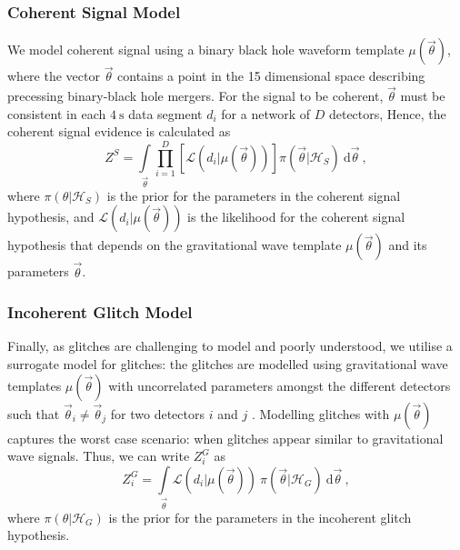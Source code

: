 \documentclass[%
preprint,
 amsmath,amssymb,
 aps,
]{revtex4}
\newcommand{\template}{{\sc $\mu(\vec{\theta})$}\xspace}
\newcommand{\parameters}{{\sc $\vec{\theta}$}\xspace}
\begin{document}
\subsubsection{Coherent Signal Model}
We model coherent signal using a binary black hole waveform template \template, where the vector \parameters contains a point in the 15 dimensional space describing precessing binary-black hole mergers. For the signal to be coherent, \parameters must be consistent in each $4\ \text{s}$ data segment $d_i$ for a network of $D$ detectors, Hence, the coherent signal evidence is calculated as
\begin{equation}
\label{eq:zs}
Z^S = \int\limits_{\vec{\theta}} \prod\limits^{D}_{i=1} \left[ \mathcal{L}(d_i|\mu(\vec{\theta}))\right] \pi(\vec{\theta}| \mathcal{H}_S)\  \text{d}\vec{\theta} \ ,
\end{equation}
where $\pi(\theta| \mathcal{H}_S)$ is the prior for the parameters in the coherent signal hypothesis, and $\mathcal{L}(d_i|\mu(\vec{\theta}))$ is the likelihood for the coherent signal hypothesis that depends on the gravitational wave template \template and its parameters \parameters. 

\subsubsection{Incoherent Glitch Model}
Finally, as glitches are challenging to model and poorly understood, we utilise a surrogate model for glitches: the glitches are modelled using gravitational wave templates  \template with uncorrelated  parameters amongst the different detectors such that  $\vec{\theta}_i \neq \vec{\theta}_j$ for two detectors $i$ and $j$ \cite{bci}.  Modelling glitches with \template captures the worst case scenario: when glitches appear similar to gravitational wave signals. Thus, we can write $Z^G_i$ as 
\begin{equation}
\label{eq:zg}
Z^G_i = \int\limits_{\vec{\theta}} \mathcal{L}(d_i|\mu(\vec{\theta}))\ \pi(\vec{\theta}| \mathcal{H}_G)\  \text{d}\vec{\theta}  \ ,
\end{equation}
where $\pi(\theta| \mathcal{H}_G)$ is the prior for the parameters in the incoherent glitch hypothesis. 
\end{document}
